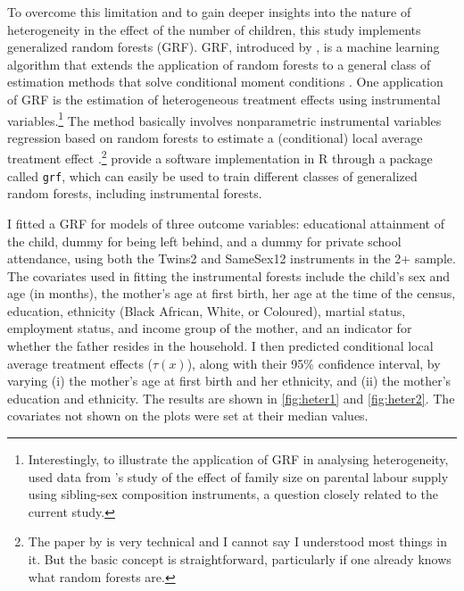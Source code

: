 To overcome this limitation and to gain deeper insights into the nature of heterogeneity in the effect of the number of children, this study implements generalized random forests (GRF). GRF, introduced by \textcite{Athey2019}, is a machine learning algorithm that extends the application of random forests to a general class of estimation methods that solve conditional moment conditions \parencite{Biewen2020}. One application of GRF is the estimation of heterogeneous treatment effects using instrumental variables.\footnote{ Interestingly, to illustrate the application of GRF in analysing heterogeneity, \textcite{Athey2019} used data from \textcite{angrist_children_1998}'s study of the effect of family size on parental labour supply using sibling-sex composition instruments, a question closely related to the current study. } The method basically involves nonparametric instrumental variables regression based on random forests to estimate a (conditional) local average treatment effect \parencite{Athey2019}.\footnote{ The paper by \textcite{Athey2019} is very technical and I cannot say I understood most things in it. But the basic concept is straightforward, particularly if one already knows what random forests are. } \textcite{Athey2019} provide a software implementation in R through a package called \texttt{grf}, which can easily be used to train different classes of generalized random forests, including instrumental forests.    

I fitted a GRF for models of three outcome variables: educational attainment of the child, dummy for being left behind, and a dummy for private school attendance, using both the Twins2 and SameSex12 instruments in the 2+ sample. The covariates used in fitting the instrumental forests include the child's sex and age (in months), the mother's age at first birth, her age at the time of the census, education, ethnicity (Black African, White, or Coloured), martial status, employment status, and income group of the mother, and an indicator for whether the father resides in the household. I then predicted conditional local average treatment effects ($ \tau(x) $), along with their 95\% confidence interval, by varying (i) the mother’s age at first birth and her ethnicity, and (ii) the mother's education and ethnicity. The results are shown in \autoref{fig:heter1} and \autoref{fig:heter2}. The covariates not shown on the plots were set at their median values. 

